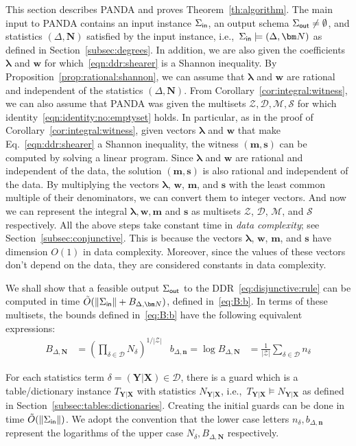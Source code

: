 \documentclass[10pt,a4paper]{article}
\newcommand{\norm}[1]{\|#1\|}
\newcommand{\calM}{\mathcal M}
\newcommand{\calS}{\mathcal S}
\newcommand{\calD}{\mathcal D}
\newcommand{\calZ}{\mathcal Z}
\newcommand{\inn}{\text{\sf in}}
\newcommand{\out}{\text{\sf out}}
\newcommand{\panda}{\textsf{PANDA}\xspace}
\begin{document}
This section describes \panda and proves Theorem~\ref{th:algorithm}.
The main input to \panda contains an input instance $\Sigma_{\inn}$,
an output schema $\Sigma_{\out}\neq \emptyset$, and
statistics $(\Delta, \bm N)$ satisfied by the input instance, i.e.,~$\Sigma_{\inn} \models (\Delta, \bm N)$
as defined in Section~\ref{subsec:degrees}.
In addition, we are also given the coefficients $\bm\lambda$ and $\bm w$
for which~\eqref{eqn:ddr:shearer} is a Shannon inequality.
By Proposition~\ref{prop:rational:shannon}, we can assume that $\bm\lambda$ and $\bm w$ are rational and independent of the statistics $(\Delta, \bm N)$.
From Corollary~\ref{cor:integral:witness}, we can also assume that \panda was given the multisets
$\calZ, \calD, \calM, \calS$ for which identity~\eqref{eqn:identity:no:emptyset} holds.
In particular, as in the proof of Corollary~\ref{cor:integral:witness},
given vectors $\bm \lambda$ and $\bm w$ that make Eq.~\eqref{eqn:ddr:shearer} a Shannon inequality,
the witness $(\bm m, \bm s)$ can be computed by solving a linear program.
Since $\bm \lambda$ and $\bm w$ are rational and independent of the data,
the solution $(\bm m, \bm s)$ is also rational and independent of the data.
By multiplying the vectors $\bm \lambda$, $\bm w$, $\bm m$, and $\bm s$ with the least common multiple of their denominators, we can convert them to integer vectors.
And now we can represent the integral $\bm\lambda, \bm w, \bm m$ and $\bm s$ as multisets $\calZ$, $\calD$, $\calM$, and $\calS$ respectively.
All the above steps take constant time in {\em data complexity}; see Section~\ref{subsec:conjunctive}.
This is because the vectors $\bm \lambda$, $\bm w$, $\bm m$, and $\bm s$ have dimension $O(1)$
in data complexity. Moreover, since the values of these vectors don't depend on the data, they are considered constants in data complexity.

We shall show that a feasible output $\Sigma_{\out}$ to the DDR~\eqref{eq:disjunctive:rule}
can be computed in time $\tilde O(\norm{\Sigma_\inn}+B_{\Delta,\bm N})$, defined in~\eqref{eq:B:b}. In terms of
these multisets, the bounds defined in~\eqref{eq:B:b} have the following equivalent
expressions:
%
\begin{align}
  B_{\Delta,\bm N}
  &= \left(\prod_{\delta \in \calD} N_{\delta}\right)^{1/|\calZ|}& b_{\Delta,\bm n} = \log B_{\Delta, \bm N}
  &= \frac{1}{|\calZ|} \sum_{\delta \in \calD} n_{\delta} \label{eq:B:b:integers}
\end{align}

For each statistics term $\delta = (\bm Y|\bm X) \in \calD$, there is a guard which is a
table/dictionary instance $T_{\bm Y|\bm X}$ with statistics $N_{\bm Y|\bm X}$, i.e.,~$T_{\bm
Y|\bm X} \models N_{\bm Y|\bm X}$ as defined in Section~\ref{subsec:tables:dictionaries}.
Creating the initial guards can be done in time $\tilde O(\norm{\Sigma_\inn})$.
We adopt the convention that the lower case letters
$n_\delta, b_{\Delta,\bm n}$ represent the logarithms of the upper case $N_\delta,
B_{\Delta,\bm N}$ respectively.
\end{document}
